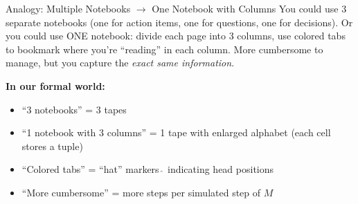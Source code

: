 \documentclass[11pt,a4paper]{article}
\begin{document}
\begin{notebox}{Analogy: Multiple Notebooks $\to$ One Notebook with Columns}
You could use 3 separate notebooks (one for action items, one for questions, one for decisions). Or you could use ONE notebook: divide each page into 3 columns, use colored tabs to bookmark where you're ``reading'' in each column. More cumbersome to manage, but you capture the \textit{exact same information}.

\textbf{In our formal world:}
\begin{itemize}[nosep]
\item ``3 notebooks'' = 3 tapes
\item ``1 notebook with 3 columns'' = 1 tape with enlarged alphabet (each cell stores a tuple)
\item ``Colored tabs'' = ``hat'' markers $\hat{~}$ indicating head positions
\item ``More cumbersome'' = more steps per simulated step of $M$
\end{itemize}
\end{notebox}
\end{document}
